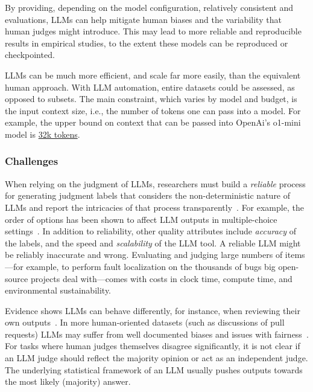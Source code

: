By providing, depending on the model configuration, relatively consistent and evaluations, LLMs can help mitigate human biases and the variability that human judges might introduce.
This may lead to more reliable and reproducible results in empirical studies, to the extent these models can be reproduced or checkpointed. %

LLMs can be much more efficient, and scale far more easily, than the equivalent human approach. With LLM automation, entire datasets could be assessed, as opposed to subsets. The main constraint, which varies by model and budget, is the input context size, i.e., the number of tokens one can pass into a model. For example, the upper bound on context that can be passed into OpenAi's \textsf{o1-mini} model is \href{https://help.openai.com/en/articles/9855712-openai-o1-models-faq-chatgpt-enterprise-and-edu}{32k tokens}. 

\subsubsection{Challenges}

When relying on the judgment of LLMs, researchers must build a \textit{reliable} process for generating judgment labels that considers the non-deterministic nature of LLMs and report the intricacies of that process transparently~\cite{DBLP:journals/corr/abs-2412-12509}. For example, the order of options has been shown to affect LLM outputs in multiple-choice settings~\cite{DBLP:conf/naacl/PezeshkpourH24}. 
In addition to reliability, other quality attributes include \textit{accuracy} of the labels, and the speed and \textit{scalability} of the LLM tool. 
A reliable LLM might be reliably inaccurate and wrong. 
Evaluating and judging large numbers of items---for example, to perform fault localization on the thousands of bugs big open-source projects deal with---comes with costs in clock time, compute time, and environmental sustainability.

Evidence shows LLMs can behave differently, for instance, when reviewing their own outputs~\cite{NEURIPS2024_7f1f0218}. In more human-oriented datasets (such as discussions of pull requests) LLMs may suffer from well documented biases and issues with fairness~\cite{Gallegos2024BiasAF}. 
For tasks where human judges themselves disagree significantly, it is not clear if an LLM judge should reflect the majority opinion or act as an independent judge. The underlying statistical framework of an LLM usually pushes outputs towards the most likely (majority) answer. 

